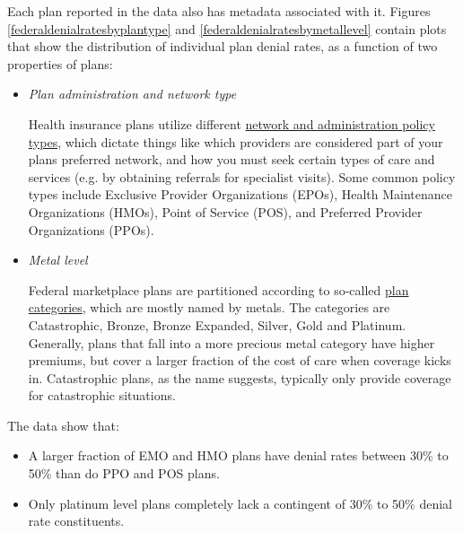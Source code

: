 \documentclass[12pt, a4paper,twoside]{report}
\theoremstyle{plain} %
\theoremstyle{definition} %
\theoremstyle{remark} %
\numberwithin{equation}{chapter}
\begin{document}
		\clearpage
	
	
		Each plan reported in the data also has metadata associated with it. Figures \ref{federaldenialratesbyplantype} and \ref{federaldenialratesbymetallevel} contain plots that show the distribution of individual plan denial rates, as a function of two properties of plans:
		
		\begin{itemize}
			\item \emph{Plan administration and network type}
			
				Health insurance plans utilize different \href{https://www.healthcare.gov/choose-a-plan/plan-types/}{network and administration policy types}, which dictate things like which providers are considered part of your plans preferred network, and how you must seek certain types of care and services (e.g. by obtaining referrals for specialist visits). Some common policy types include Exclusive Provider Organizations (EPOs), Health Maintenance Organizations (HMOs), Point of Service (POS), and Preferred Provider Organizations (PPOs).
			
			\item \emph{Metal level}
			
			
				Federal marketplace plans are partitioned according to so-called \href{https://www.healthcare.gov/choose-a-plan/plans-categories/}{plan categories}, which are mostly named by metals. The categories are Catastrophic, Bronze, Bronze Expanded, Silver, Gold and Platinum. Generally, plans that fall into a more precious metal category have higher premiums, but cover a larger fraction of the cost of care when coverage kicks in. Catastrophic plans, as the name suggests, typically only provide coverage for catastrophic situations.
		\end{itemize}
	
		The data show that:
		
		\begin{itemize}
			\item A larger fraction of EMO and HMO plans have denial rates between 30\% to 50\% than do PPO and POS plans.
			\item Only platinum level plans completely lack a contingent of 30\% to 50\% denial rate constituents.
		\end{itemize}
	
\end{document}
